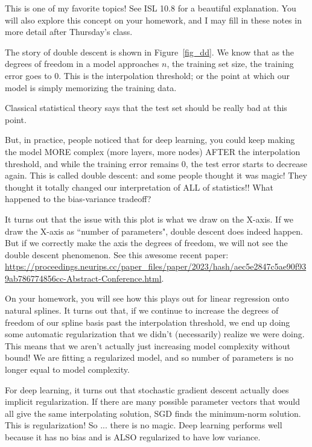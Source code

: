 This is one of my favorite topics! See ISL 10.8 for a beautiful explanation. You will also explore this concept on your homework, and I may fill in these notes in more detail after Thursday's class. 

The story of double descent is shown in Figure~\ref{fig_dd}. We know that as the degrees of freedom in a model approaches $n$, the training set size, the training error goes to $0$. This is the interpolation threshold; or the point at which our model is simply memorizing the training data.

Classical statistical theory says that the test set should be really bad at this point.

But, in practice, people noticed that for deep learning, you could keep making the model MORE complex (more layers, more nodes) AFTER the interpolation threshold, and while the training error remains 0, the test error starts to decrease again. This is called double descent: and some people thought it was magic! They thought it totally changed our interpretation of ALL of statistics!! What happened to the bias-variance tradeoff?

It turns out that the issue with this plot is what we draw on the X-axis. If we draw the X-axis as ``number of parameters", double descent does indeed happen. But if we correctly make the axis the degrees of freedom, we will not see the double descent phenomenon. See this awesome recent paper: \url{https://proceedings.neurips.cc/paper_files/paper/2023/hash/aec5e2847c5ae90f939ab786774856cc-Abstract-Conference.html}. 

On your homework, you will see how this plays out for linear regression onto natural splines. It turns out that, if we continue to increase the degrees of freedom of our spline basis past the interpolation threshold, we end up doing some automatic regularization that we didn't (necessarily) realize we were doing. This means that we aren't actually just increasing model complexity without bound! We are fitting a regularized model, and so number of parameters is no longer equal to model complexity. 

For deep learning, it turns out that stochastic gradient descent actually does implicit regularization. If there are many possible parameter vectors that would all give the same interpolating solution, SGD finds the minimum-norm solution. This is regularization! So ... there is no magic. Deep learning performs well because it has no bias and is ALSO regularized to have low variance. 

